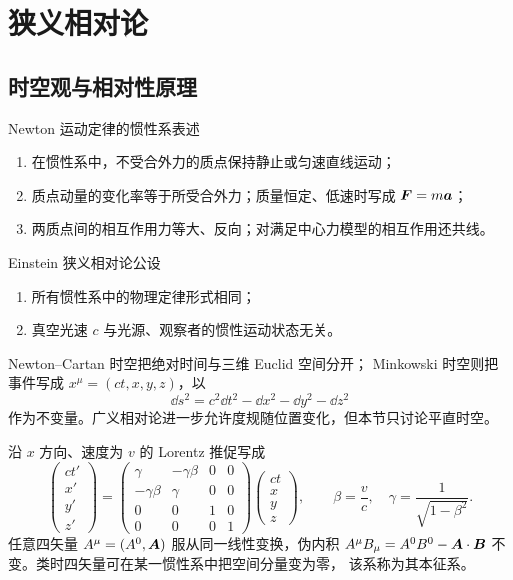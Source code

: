 \section{狭义相对论}

\subsection{时空观与相对性原理}

\begin{advtheorem}{Newton 运动定律的惯性系表述}\label{advA6:thm:newton-laws}
\begin{enumerate}
\item 在惯性系中，不受合外力的质点保持静止或匀速直线运动；
\item 质点动量的变化率等于所受合外力；质量恒定、低速时写成
$\bm{F}=m\bm{a}$；
\item 两质点间的相互作用力等大、反向；对满足中心力模型的相互作用还共线。
\end{enumerate}
\end{advtheorem}

\begin{advtheorem}{Einstein 狭义相对论公设}\label{advA6:thm:einstein-postulates}
\begin{enumerate}
\item 所有惯性系中的物理定律形式相同；
\item 真空光速 $c$ 与光源、观察者的惯性运动状态无关。
\end{enumerate}
\end{advtheorem}

Newton--Cartan 时空把绝对时间与三维 Euclid 空间分开；
Minkowski 时空则把事件写成
$x^\mu=(ct,x,y,z)$，以
\[
 \dd s^2=c^2\dd t^2-\dd x^2-\dd y^2-\dd z^2
\]
作为不变量。广义相对论进一步允许度规随位置变化，但本节只讨论平直时空。

沿 $x$ 方向、速度为 $v$ 的 Lorentz 推促写成
\[
\begin{pmatrix}ct'\\x'\\y'\\z'\end{pmatrix}
=
\begin{pmatrix}
\gamma&-\gamma\beta&0&0\\
-\gamma\beta&\gamma&0&0\\
0&0&1&0\\0&0&0&1
\end{pmatrix}
\begin{pmatrix}ct\\x\\y\\z\end{pmatrix},
\qquad
\beta=\frac vc,\quad \gamma=\frac1{\sqrt{1-\beta^2}}.
\]
任意四矢量 $A^\mu=(A^0,\bm{A})$ 服从同一线性变换，伪内积
$A^\mu B_\mu=A^0B^0-\bm{A}\cdot\bm{B}$ 不变。类时四矢量可在某一惯性系中把空间分量变为零，
该系称为其本征系。

